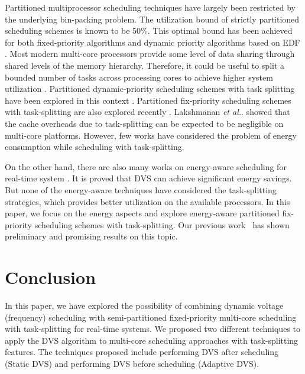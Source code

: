 \documentclass[12pt, journal,compsoc]{IEEEtran}
\begin{document}
Partitioned multiprocessor scheduling techniques have largely been restricted by the underlying bin-packing problem. The utilization bound of strictly partitioned scheduling schemes is known to be 50\%. This optimal bound has been achieved for both fixed-priority algorithms \cite{10.1109/EMRTS.2003.1212725} and dynamic priority algorithms based on EDF \cite{Lopez:2004:UBE:1008193.1008208}. Most modern multi-core processors provide some level of data sharing through shared levels of the memory hierarchy. Therefore, it could be useful to split a bounded number of tasks across processing cores to achieve higher system utilization \cite{NizR06}. Partitioned dynamic-priority scheduling schemes with task splitting have been explored in this context \cite{Andersson:2006:MSF:1157741.1158329} \cite{Kato:2007:RST:1306877.1307300}. Partitioned fix-priority scheduling schemes with task-splitting are also explored recently \cite{Lakshmanan:2009:PFP:1581378.1581523} \cite{Guan:2010:FMS:1828428.1829220}. Lakshmanan \emph{et al.}. \cite{Lakshmanan:2009:PFP:1581378.1581523} showed that the cache overheads due to task-splitting can be expected to be negligible on multi-core platforms. However, few works have considered the problem of energy consumption while scheduling with task-splitting.

On the other hand, there are also many works on energy-aware scheduling for real-time system \cite{Aydin:2003:EPM:838237.838347,Mei-2013,Fan-SAC13,Wu-HPCC13}. It is proved that DVS can achieve significant energy savings. But none of the energy-aware techniques have considered the task-splitting strategies, which provides better utilization on the available processors. In this paper, we focus on the energy aspects and explore energy-aware partitioned fix-priority scheduling schemes with task-splitting. Our previous work~\cite{Lu-RTCSA13} has shown preliminary and promising results on this topic.


















\section{Conclusion}
\label{con}

In this paper, we have explored the possibility of combining dynamic voltage (frequency) scheduling with semi-partitioned fixed-priority multi-core scheduling with task-splitting for real-time systems. We proposed two different techniques to apply the DVS algorithm to multi-core scheduling approaches with task-splitting features. The techniques proposed include performing DVS after scheduling (Static DVS) and performing DVS before scheduling (Adaptive DVS).
\end{document}
